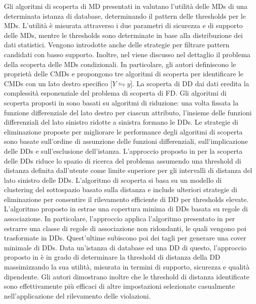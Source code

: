 Gli algoritmi di scoperta di MD presentati in \cite{efficientdiscoveryofsimilarity} valutano l'utilit\`{a} delle MDs di una determinata istanza di database, determinando il pattern delle thresholds per le MDs. L'utilit\`{a} \`{e} misurata attraverso i due parametri di sicurezza e di supporto delle MDs, mentre le thresholds sono determinate in base alla distribuzione dei dati statistici. Vengono introdotte anche delle strategie per filtrare pattern candidati con basso supporto. Inoltre, nel \cite{discoveringconditionalmatchingrules} viene discusso nel dettaglio il problema della scoperta delle MDs condizionali. In particolare, gli autori definiscono le propriet\`{a} delle CMDs e propongono tre algoritmi di scoperta per identificare le CMDs con un lato destro specifico [$Y\leftrightharpoons y$]. La scoperta di DD dai dati eredita la complessit\`{a} esponenziale del problema di scoperta di FD. Gli algoritmi di scoperta proposti in \cite{differentialdependencies} sono basati su algoritmi di riduzione: una volta fissata la funzione differenziale del lato destro per ciascun attributo, l'insieme delle funzioni differenziali del lato sinistro ridotte a sinistra formano le DDs. Le strategie di eliminazione proposte per migliorare le performance degli algoritmi di scoperta sono basate sull'ordine di assunzione delle funzioni differenziali, sull'implicazione delle DDs e sull'esclusione dell'istanza. L'approccio proposto in \cite{miningdd} per la scoperta delle DDs riduce lo spazio di ricerca del problema assumendo una threshold di distanza definita dall'utente come limite superiore per gli intervalli di distanza del lato sinistro delle DDs. L'algoritmo di scoperta si basa su un modello di clustering del sottospazio basato sulla distanza e include ulteriori strategie di eliminazione per consentire il rilevamento efficiente di DD per thresholds elevate. L'algoritmo proposto in \cite{efficientdiscoverydd} estrae una copertura minima di DDs basata su regole di associazione. In particolare, l'approccio applica l'algoritmo presentato in \cite{optimalrulediscovry} per estrarre una classe di regole di associazione non ridondanti, le quali vengono poi trasformate in DDs. Quest'ultime subiscono poi dei tagli per generare una cover minimale di DDs. Data un'istanza di database ed una DD di questo, l'approccio proposto in \cite{efficientdeterminationofdistance4dd} \`{e} in grado di determinare la threshold di distanza della DD massimizzando la sua utilit\`{a}, misurata in termini di supporto, sicurezza e qualit\`{a} dipendente. Gli autori dimostrano inoltre che le threshold di distanza identificate sono effettivamente pi\`{u} efficaci di altre impostazioni selezionate casualmente nell'applicazione del rilevamento delle violazioni.\par
